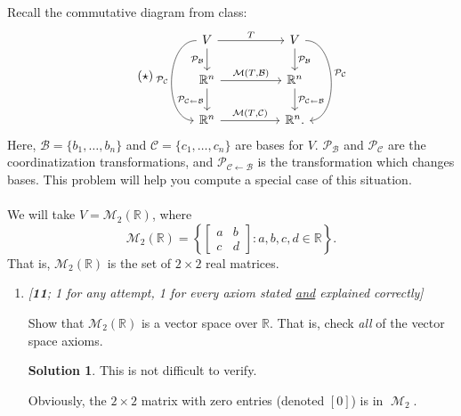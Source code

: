 \documentclass{amsart}
\theoremstyle{definition}
\theoremstyle{definition}
\newtheorem*{solution}{Solution}
\DeclareMathOperator{\1}{\mathbbm{1}}
\DeclareMathOperator{\MM}{\mathcal{M}}
\begin{document}
\begin{enumerate}[itemsep = 2mm]
		
		Recall the commutative diagram from class:
		\begin{equation}
		\label{commutativediagram}
		\tag{$\star$}
		\begin{tikzcd}
		V\arrow[rr,"T"]\arrow[d,"\mathcal{P}_{\mathcal{B}}",swap]\arrow[dd, bend right=90,"\mathcal{P}_{\mathcal{C}}",swap]&&V\arrow[d,"\mathcal{P}_{\mathcal{B}}"]\arrow[dd, bend left=90,"\mathcal{P}_{\mathcal{C}}"]\\
		\mathbb{R}^n\arrow[rr, "\mathcal{M}(T{,} \mathcal{B})"]\arrow[d, "\mathcal{P}_{\mathcal{C}\leftarrow\mathcal{B}}",swap]&&\mathbb{R}^n\arrow[d, "\mathcal{P}_{\mathcal{C}\leftarrow\mathcal{B}}"]\\
		\mathbb{R}^n\arrow[rr,"\mathcal{M}(T{,}\mathcal{C})"]&&\mathbb{R}^n.
		\end{tikzcd}
		\end{equation}
		Here, $\mathcal{B}=\{b_1,\ldots, b_n\}$ and $\mathcal{C}=\{c_1,\ldots, c_n\}$ are bases for $V$. $\mathcal{P}_{\mathcal{B}}$ and $\mathcal{P}_{\mathcal{C}}$ are the coordinatization transformations, and $\mathcal{P}_{\mathcal{C}\leftarrow\mathcal{B}}$ is the transformation which changes bases. This problem will help you compute a special case of this situation. \\\\
		We will take $V=\mathcal{M}_2(\mathbb{R})$, where 
		\begin{equation*}
		\mathcal{M}_2(\mathbb{R})=\left\{
		\begin{bmatrix}
		a&b\\
		c&d
		\end{bmatrix}: a,b,c,d\in \mathbb{R}\right\}.
		\end{equation*}
		That is, $\mathcal{M}_2(\mathbb{R})$ is the set of $2\times 2$ real matrices. 
		\begin{enumerate}[label=\arabic*.]
			\item \textit{[\textbf{11}; 1 for any attempt, 1 for every axiom stated \uline{and} explained correctly]}
			
			Show that $\mathcal{M}_2(\mathbb{R})$ is a vector space over $\mathbb{R}$. That is, check \textit{all} of the vector space axioms. 
			
			\begin{solution}
				This is not difficult to verify.
				
				Obviously, the $2 \times 2$ matrix with zero entries (denoted $[0]$) is in $\MM_{2}$.
				

\end{solution}
\end{enumerate}
\end{enumerate}
\end{document}
